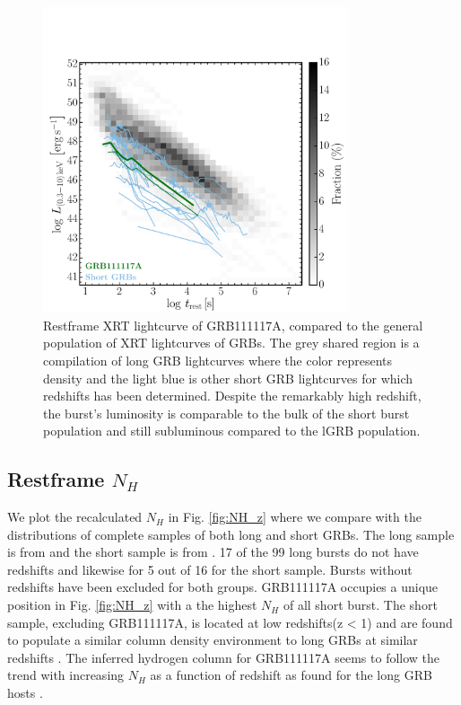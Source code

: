 \documentclass{aa}    %
\begin{document}
\begin{figure}
	\centering
	\includegraphics[width=9cm]{figures/XLC_111117A_rest.pdf}
	\caption{Restframe XRT lightcurve of GRB111117A, compared to the general population of XRT lightcurves of GRBs. The grey shared region is a compilation of long GRB lightcurves where the color represents density and the light blue is other short GRB lightcurves for which redshifts has been determined. Despite the remarkably high redshift, the burst’s luminosity is comparable to the bulk of the short burst population and still subluminous compared to the lGRB population.}
	\label{fig:sxray_lightcurve}
\end{figure}




\subsection{Restframe $N_H$}

We plot the recalculated $N_H$ in Fig. \ref{fig:NH_z} where we compare with the distributions of complete samples of both long and short GRBs. The long sample is from \citet{Arcodia2016} and the short sample is from \citet{DAvanzo2014a}. 17 of the 99 long bursts do not have redshifts and likewise for 5 out of 16 for the short sample. Bursts without redshifts have been excluded for both groups. GRB111117A occupies a unique position in Fig. \ref{fig:NH_z} with a the highest $N_H$ of all short burst. The short sample, excluding GRB111117A, is located at low redshifts(z < 1) and are found to populate a similar column density environment to long GRBs at similar redshifts \citep{DAvanzo2014a}. The inferred hydrogen column for GRB111117A seems to follow the trend with increasing $N_H$ as a function of redshift as found for the long GRB hosts \citep{Arcodia2016}.   
\end{document}
